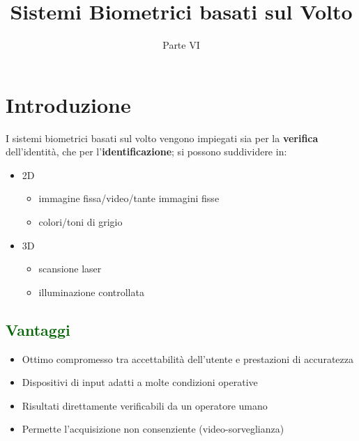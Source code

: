 \documentclass{report}
\title{Sistemi Biometrici basati sul Volto}
\date{Parte VI}
\begin{document}
\maketitle

\tableofcontents
\newpage

\chapter{Introduzione}

I sistemi biometrici basati sul volto vengono impiegati sia per la \textbf{verifica} dell'identità, che 
per l'\textbf{identificazione}; si possono suddividere in:
\begin{itemize}
    \item 2D
    \begin{itemize}
        \item immagine fissa/video/tante immagini fisse
        \item colori/toni di grigio
    \end{itemize}
    \item 3D
    \begin{itemize}
        \item scansione laser
        \item illuminazione controllata
    \end{itemize}
\end{itemize}

\section{\textcolor{darkgreen}{Vantaggi}}
\begin{itemize}
    \item Ottimo compromesso tra accettabilità dell'utente e prestazioni di accuratezza 
    \item Dispositivi di input adatti a molte condizioni operative 
    \item Risultati direttamente verificabili da un operatore umano 
    \item Permette l'acquisizione non consenziente (video-sorveglianza)
\end{itemize}
\end{document}
